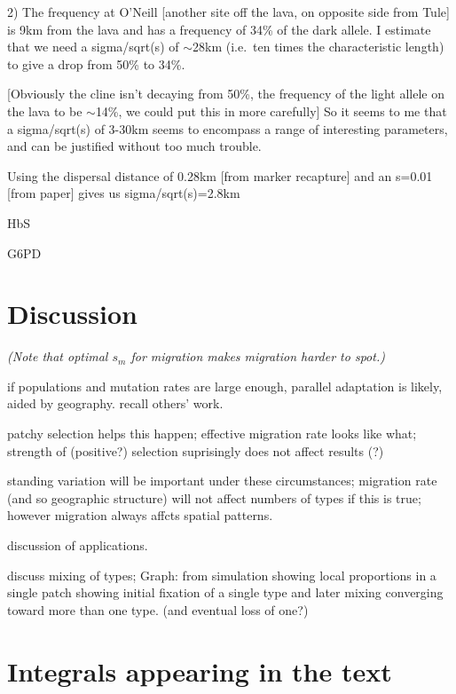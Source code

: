 \documentclass{article}
\newcommand{\plr}[1]{{\it\color{blue}(#1)}}
\begin{document}
2) The frequency at O'Neill [another site off the lava, on opposite side from Tule]  is 9km from the lava and has a frequency of 34\% of the dark allele. I estimate that we need a sigma/sqrt(s) of $\sim$28km (i.e.\ ten times the characteristic length) to give a drop from 50\% to 34\%.

[Obviously the cline isn't decaying from 50\%, the frequency of the light allele on the lava to be $\sim$14\%, we could put this in more carefully]
So it seems to me that a sigma/sqrt(s) of 3-30km seems to encompass a range of interesting parameters, and can be justified without too much trouble.


Using the dispersal distance of 0.28km [from marker recapture] and an s=0.01 [from paper] gives us sigma/sqrt(s)=2.8km

HbS

G6PD

\section{Discussion} 

\plr{Note that optimal $s_m$ for migration makes migration harder to spot.}

if populations and mutation rates are large enough, parallel adaptation is likely, aided by geography. 
recall others' work. 

patchy selection helps this happen; 
effective migration rate looks like what; 
strength of (positive?) selection suprisingly does not affect results (?) 

standing variation will be important under these circumstances; 
migration rate (and so geographic structure) will not affect numbers of types if this is true; 
however migration always affcts spatial patterns. 

discussion of applications. 

discuss mixing of types; 
Graph: from simulation showing local proportions in a single patch showing initial fixation of a single type and later mixing converging toward more than one type.  (and eventual loss of one?)



\appendix

\section{Integrals appearing in the text}
    \label{apx:integrals}
\end{document}
